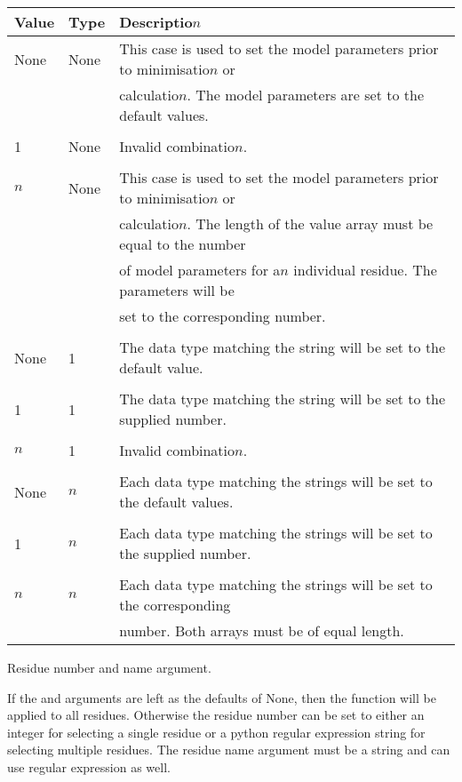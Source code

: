 \begin{center}
\begin{tabular}{lll}
\toprule
Value & Type & Descriptio$n$ \\
\midrule
None & None & This case is used to set the model parameters prior to minimisatio$n$ or \\
 &  & calculatio$n$.  The model parameters are set to the default values. \\
 &  &  \\
1 & None & Invalid combinatio$n$. \\
 &  &  \\
$n$ & None & This case is used to set the model parameters prior to minimisatio$n$ or \\
 &  & calculatio$n$.  The length of the value array must be equal to the number \\
 &  & of model parameters for a$n$ individual residue.  The parameters will be \\
 &  & set to the corresponding number. \\
 &  &  \\
None & 1 & The data type matching the string will be set to the default value. \\
 &  &  \\
1 & 1 & The data type matching the string will be set to the supplied number. \\
 &  &  \\
$n$ & 1 & Invalid combinatio$n$. \\
 &  &  \\
None & $n$ & Each data type matching the strings will be set to the default values. \\
 &  &  \\
1 & $n$ & Each data type matching the strings will be set to the supplied number. \\
 &  &  \\
$n$ & $n$ & Each data type matching the strings will be set to the corresponding \\
 &  & number.  Both arrays must be of equal length. \\
\bottomrule
\end{tabular}
\end{center}


Residue number and name argument.


If the  and  arguments are left as the defaults of None, then the function will be applied to all residues.  Otherwise the residue number can be set to either an integer for selecting a single residue or a python regular expression string for selecting multiple residues.  The residue name argument must be a string and can use regular expression as well.



